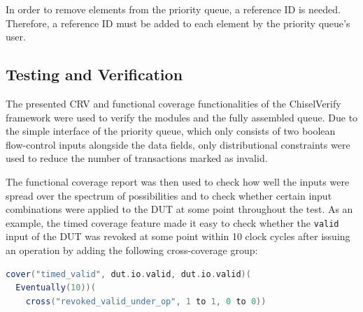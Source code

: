 \documentclass[conference]{IEEEtran}
\begin{document}
In order to remove elements from the priority queue, a reference ID is needed. 
Therefore, a reference ID must be added to each element by the priority queue's user.

%
%

\subsection{Testing and Verification}

The presented CRV and functional coverage functionalities of the ChiselVerify framework were used to verify the modules and the fully assembled queue.
Due to the simple interface of the priority queue, which only consists of two boolean flow-control inputs alongside the data fields, only distributional constraints were used to reduce the number of transactions marked as invalid. 

The functional coverage report was then used to check how well the inputs were spread over the spectrum of possibilities and to check whether certain input combinations were applied to the DUT at some point throughout the test. 
As an example, the timed coverage feature made it easy to check whether the \texttt{valid} input of the DUT was revoked at some point within 10 clock cycles after issuing an operation by adding the following cross-coverage group:

\begin{lstlisting}[language=scala, caption={A timed cover construct.}, label={lst:timedcover}]
cover("timed_valid", dut.io.valid, dut.io.valid)(
  Eventually(10))(
    cross("revoked_valid_under_op", 1 to 1, 0 to 0))
\end{lstlisting}
\end{document}
